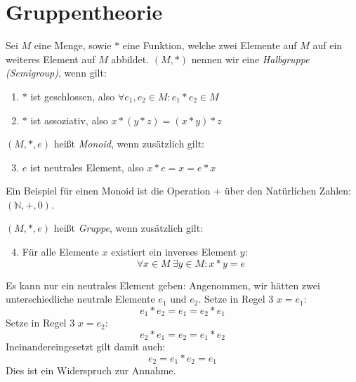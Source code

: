 \chapter{Gruppentheorie}

Sei $M$ eine Menge, sowie $*$ eine Funktion, welche zwei Elemente auf $M$ auf ein weiteres Element auf $M$ abbildet. $(M,*)$ nennen wir eine {\em Halbgruppe (Semigroup)}, wenn gilt:
\begin{enumerate}
  \item $*$ ist geschlossen, also $\forall e_1, e_2 \in M: e_1 * e_2 \in M$
  \item $*$ ist assoziativ, also $x*(y*z)=(x*y)*z$
\end{enumerate}

$(M,*,e)$ heißt {\em Monoid}, wenn zusätzlich gilt:

\begin{enumerate}
\setcounter{enumi}{2}
  \item $e$ ist neutrales Element, also $x*e = x = e*x$
\end{enumerate}

Ein Beispiel für einen Monoid ist die Operation $+$ über den Natürlichen Zahlen: $(\mathbb{N},+,0)$.

$(M,*,e)$ heißt {\em Gruppe}, wenn zusätzlich gilt:

\begin{enumerate}
\setcounter{enumi}{3}
  \item Für alle Elemente $x$ existiert ein inverses Element $y$:
  $$\forall x \in M\ \exists y \in M: x*y=e$$
\end{enumerate}


Es kann nur ein neutrales Element geben: Angenommen, wir hätten zwei unterschiedliche neutrale Elemente $e_1$ und $e_2$. Setze in Regel 3 $x=e_1$:
$$ e_1 * e_2 = e_1 = e_2 * e_1 $$
Setze in Regel 3 $x=e_2$:
$$ e_2 * e_1 = e_2 = e_1 * e_2 $$
Ineinandereingesetzt gilt damit auch:
$$ e_2 = e_1 * e_2 = e_1 $$
Dies ist ein Widerspruch zur Annahme.


